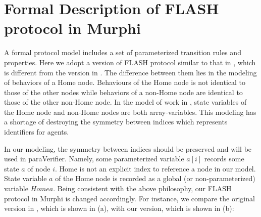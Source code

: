 \documentclass{llncs}
\begin{document}





\section{Formal Description of FLASH protocol in Murphi\label{sec:formalDescription}}
A formal protocol model includes a set of parameterized transition rules and properties.  Here we adopt a version of FLASH protocol similar to that in \cite{cubeicBeyond}, which is different from the version in \cite{Chou2004}. The difference between them lies in the modeling of behaviors of a Home node. Behaviours of the Home node is not identical to those of the other nodes while behaviors of
 a non-Home node are identical to those of the other non-Home node. In the model of work in \cite{Chou2004}, state variables of the Home node and non-Home nodes are both array-variables. This modeling has a shortage of destroying the symmetry between indices which represents identifiers for agents.

In our modeling, the symmetry between indices should be preserved and will be used in {\sf paraVerifier}. Namely,  %
some parameterized variable $a[i]$ records some state  $a$ of node $i$. Home is not an explicit index to reference a node in our model. State variable
  $a$ of the Home node  is recorded as a global  (or non-parameterized) variable $Homea$. %
 Being consistent with the above philosophy, our FLASH protocol in Murphi is changed accordingly. For instance, we compare the original version in \cite{Chou2004}, which is shown in (a), with our version, which is shown in (b):
\end{document}
